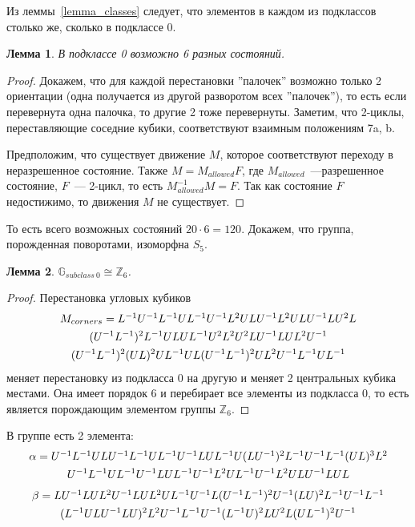 \documentclass[utf8,a4paper,draft]{article}
\newtheorem{lemma_cub}{Лемма}
\begin{document}
Из леммы~\ref{lemma_classes} следует, что элементов в каждом из подклассов столько же, сколько в подклассе 0.
\begin{lemma_cub}
В подклассе 0 возможно 6 разных состояний.
\end{lemma_cub}
\begin{proof}
Докажем, что для каждой перестановки ''палочек'' возможно только 2 ориентации (одна получается из другой разворотом всех ''палочек''), то есть если перевернута одна палочка, то другие 2 тоже перевернуты.
Заметим, что 2-циклы, переставляющие соседние кубики, соответствуют взаимным положениям 7a, b.

Предположим, что существует движение $M$, которое соответствуют переходу в неразрешенное состояние. Также $M=M_{allowed}F$, где $M_{allowed}$~---разрешенное состояние, $F$~--- 2-цикл, то есть $M_{allowed}^{-1}M=F$. Так как состояние $F$ недостижимо, то движения $M$ не существует.
\end{proof}
То есть всего возможных состояний $20\cdot 6=120$.
Докажем, что группа, порожденная поворотами, изоморфна $S_5$.
\begin{lemma_cub}
\label{lemma4}
$\mathbb{G}_{subclass~0} \cong \mathbb{Z}_6$.
\end{lemma_cub}
\begin{proof}
Перестановка угловых кубиков
\begin{multline*}
$$
M_{corners}=L^{-1}U^{-1}L^{-1}UL^{-1}U^{-1}L^2ULU^{-1}L^2ULU^{-1}LU^2L \\
	(U^{-1}L^{-1})^2L^{-1}ULUL^{-1}U^2L^2U^2LU^{-1}LUL^2U^{-1} \\
		(U^{-1}L^{-1})^2(UL)^2UL^{-1}UL(U^{-1}L^{-1})^2UL^2U^{-1}L^{-1}UL^{-1}
$$
\end{multline*}
меняет перестановку из подкласса 0 на другую и меняет 2 центральных кубика местами. Она имеет порядок 6 и перебирает все элементы из подкласса 0, то есть является порождающим элементом группы $\mathbb{Z}_6$.
\end{proof}
В группе есть 2 элемента:
\begin{multline*} %
$$
\alpha=U^{-1}L^{-1}ULU^{-1}L^{-1}UL^{-1}U^{-1}LUL^{-1}U(LU^{-1})^2L^{-1}U^{-1}L^{-1}(UL)^3L^2 \\
	U^{-1}L^{-1}UL^{-1}U^{-1}LUL^{-1}U^{-1}L^2UL^{-1}U^{-1}L^2ULU^{-1}LUL
$$
\end{multline*}
\begin{multline*} %
$$
\beta=LU^{-1}LUL^2U^{-1}LUL^2UL^{-1}U^{-1}L(U^{-1}L^{-1})^2U^{-1}(LU)^2L^{-1}U^{-1}L^{-1}\\ 
		(L^{-1}ULU^{-1}LU)^2L^2U^{-1}L^{-1}U^{-1}(L^{-1}U)^2LU^2L(UL^{-1})^2U^{-1}
$$
\end{multline*}
\end{document}
